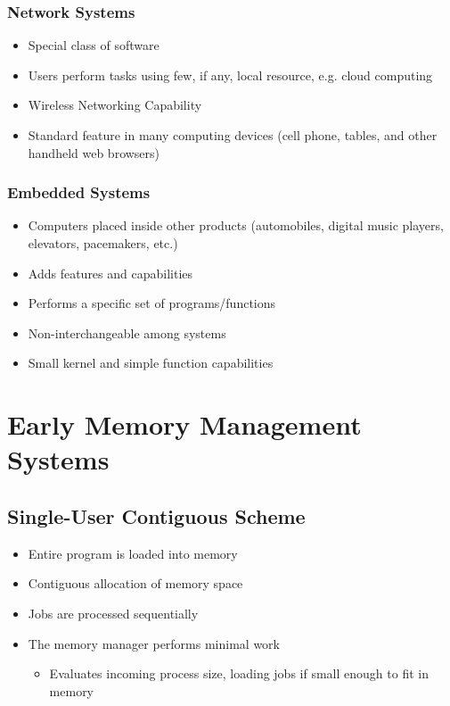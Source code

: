 \documentclass[12pt letter]{report}
\begin{document}
\subsection{Network Systems}

\begin{itemize}
  \item Special class of software
  \item Users perform tasks using few, if any, local resource, e.g. cloud computing
  \item Wireless Networking Capability
  \item Standard feature in many computing devices (cell phone, tables, and other handheld web browsers)
\end{itemize}

\subsection{Embedded Systems}
\begin{itemize}
  \item Computers placed inside other products (automobiles, digital music players, elevators, pacemakers, etc.)
  \item Adds features and capabilities
  \item Performs a specific set of programs/functions
  \item Non-interchangeable among systems
  \item Small kernel and simple function capabilities
\end{itemize}


\chapter{Early Memory Management Systems}

\section {Single-User Contiguous Scheme}

\begin{itemize}
  \item Entire program is loaded into memory
  \item  Contiguous allocation of memory space
  \item Jobs are processed sequentially
  \item The memory manager performs minimal work
        \begin{itemize}
          \item Evaluates incoming process size, loading jobs if small enough to fit in memory
        \end{itemize}
\end{itemize}
\end{document}
